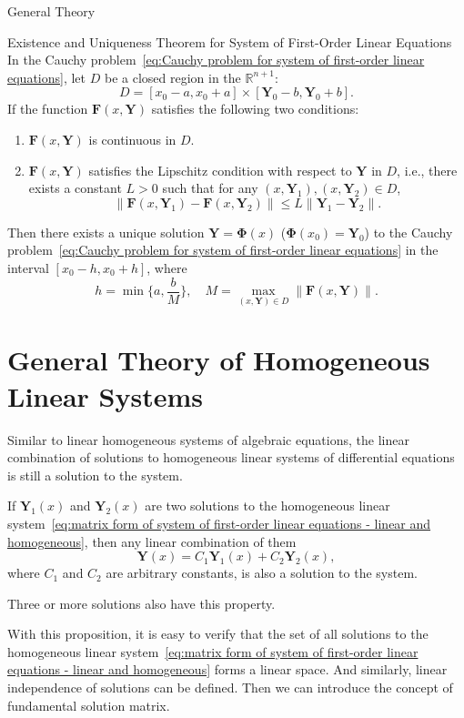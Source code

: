 \documentclass[11pt]{../../TexTemplate/elegantbook}
\begin{document}
\begin{leftbarTitle}{General Theory}\end{leftbarTitle}

\begin{theorem}{Existence and Uniqueness Theorem for System of First-Order Linear Equations}
    \label{thm:existence and uniqueness theorem for system of first-order linear equations}
    In the Cauchy problem~\eqref{eq:Cauchy problem for system of first-order linear equations},
    let \(D\) be a closed region in the \(\mathbb{R}^{n+1}\):
    \[
    D = [x_{0}-a, x_{0}+a] \times [\mathbf{Y}_{0}-b, \mathbf{Y}_{0}+b].
    \]
    If the function \(\mathbf{F}(x, \mathbf{Y})\) satisfies the following two conditions:
    \begin{enumerate}
        \item \(\mathbf{F}(x, \mathbf{Y})\) is continuous in \(D\).
        \item \(\mathbf{F}(x, \mathbf{Y})\) satisfies the Lipschitz condition with respect to \(\mathbf{Y}\) in \(D\), 
            i.e., there exists a constant \(L > 0\) such that for any \((x, \mathbf{Y}_{1}), (x, \mathbf{Y}_{2}) \in D\),
            \[
            \|\mathbf{F}(x, \mathbf{Y}_{1}) - \mathbf{F}(x, \mathbf{Y}_{2})\| \leqslant  L \|\mathbf{Y}_{1} - \mathbf{Y}_{2}\|.
            \]
    \end{enumerate}
    Then there exists a unique solution \(\mathbf{Y} = \mathbf{\Phi}(x)\) (\(\mathbf{\Phi}(x_0) = \mathbf{Y}_0\))
    to the Cauchy problem~\eqref{eq:Cauchy problem for system of first-order linear equations}
    in the interval \([x_{0}-h, x_{0}+h]\), where
    \[
    h = \min\{a, \frac{b}{M}\}, \quad M = \max_{(x, \mathbf{Y}) \in D} \|\mathbf{F}(x, \mathbf{Y})\|.
    \]
\end{theorem}

\section{General Theory of Homogeneous Linear Systems}
Similar to linear homogeneous systems of algebraic equations,
the linear combination of solutions to homogeneous linear systems of differential equations
is still a solution to the system.
\begin{proposition}
    If \(\mathbf{Y}_{1}(x)\) and \(\mathbf{Y}_{2}(x)\) are two solutions to the homogeneous linear system~\eqref{eq:matrix form of system of first-order linear equations - linear and homogeneous},
    then any linear combination of them
    \[
    \mathbf{Y}(x) = C_{1} \mathbf{Y}_{1}(x) + C_{2} \mathbf{Y}_{2}(x),
    \]
    where \(C_{1}\) and \(C_{2}\) are arbitrary constants, is also a solution to the system.

    Three or more solutions also have this property.
\end{proposition}
With this proposition, it is easy to verify that the set of all solutions to 
the homogeneous linear system~\eqref{eq:matrix form of system of first-order linear equations - linear and homogeneous}
forms a linear space. And similarly, linear independence of solutions can be defined.
Then we can introduce the concept of fundamental solution matrix.
\end{document}
